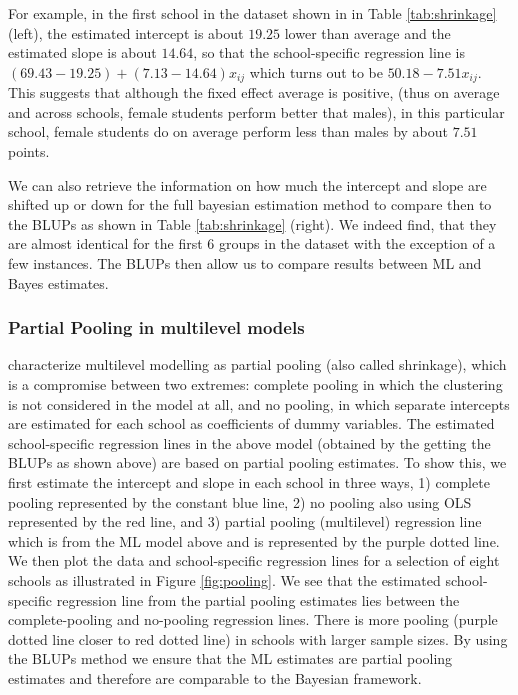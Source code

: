 For example, in the first school in the dataset shown in in Table \ref{tab:shrinkage} (left), the estimated intercept is about $19.25$ lower than average and the estimated slope is about $14.64$, so that the school-specific regression line is $(69.43 - 19.25) + (7.13 - 14.64) x_{ij}$ which turns out to be $ 50.18 - 7.51  x_{ij}$. This suggests that although the fixed effect average is positive, (thus on average and across schools, female students perform better that males), in this particular school, female students do on average perform less than males by about $7.51$ points.

We can also retrieve the information on how much the intercept and slope are shifted up or down for the full bayesian estimation method to compare then to the BLUPs as shown in Table \ref{tab:shrinkage} (right). We indeed find, that they are almost identical for the first 6 groups in the dataset with the exception of a few instances. The BLUPs then allow us to compare results between ML and Bayes estimates.

\subsubsection*{Partial Pooling in multilevel models}
\cite{gelman2006data} characterize multilevel modelling as partial pooling (also called shrinkage), which is a compromise between two extremes: complete pooling in which the clustering is not considered in the model at all, and no pooling, in which separate intercepts are estimated for each school as coefficients of dummy variables. The estimated school-specific regression lines in the above model (obtained by the getting the BLUPs as shown above) are based on partial pooling estimates. To show this, we first estimate the intercept and slope in each school in three ways, 1) complete pooling represented by the constant blue line, 2) no pooling also using OLS represented by the red line, and 3) partial pooling (multilevel) regression line which is from the ML model above and is represented by the purple dotted line. We then plot the data and school-specific regression lines for a selection of eight schools as illustrated in Figure \ref{fig:pooling}. We see that the estimated school-specific regression line from the partial pooling estimates lies between the complete-pooling and no-pooling regression lines. There is more pooling (purple dotted line closer to red dotted line) in schools with larger sample sizes. By using the BLUPs method we ensure that the ML estimates are partial pooling estimates and therefore are comparable to the Bayesian framework.

